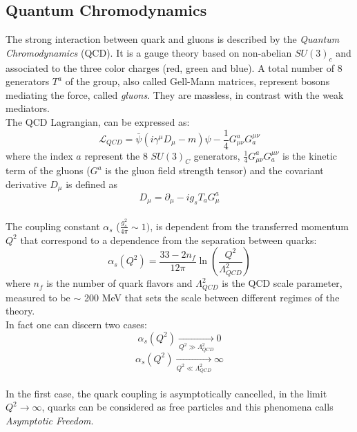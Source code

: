 \subsection{Quantum Chromodynamics} 

The strong interaction between quark and gluons is described by the \textit{Quantum Chromodynamics} (QCD). It is a gauge theory based on non-abelian 
$SU(3)_{c}$\footnotemark {}
and associated to the three color charges (red, green and blue). A total number of 8 generators $T^a$ of the group, also called Gell-Mann matrices,
represent bosons mediating the force, called \textit{gluons}. They are massless, in contrast with the weak mediators.
\vspace{\baselineskip}
\\The QCD Lagrangian, can be expressed as:
\begin{equation}
\mathcal{L}_{QCD}  =  \bar{\psi}(i\gamma^{\mu}D_{\mu}-m)\psi-\frac{1}{4}G^{a}_{\mu\nu}G^{\mu\nu}_a
\end{equation}
where the index $a$ represent the 8 $SU(3)_C$ generators,  $\frac{1}{4}G^{a}_{\mu\nu}G^{\mu\nu}_a$ is the kinetic term of the gluons ($G^a$ is the gluon field strength tensor) and the covariant derivative $D_{\mu}$ is defined as
\begin{equation}
D_{\mu}=\partial_{\mu}-ig_{s}T_{a}G^{a}_{\mu}
\end{equation}
\vspace{\baselineskip}
\\The coupling constant $\alpha_{s}$ ($\frac{g^2_s}{4\pi}\sim 1)$, is dependent from the transferred momentum $Q^2$ that correspond to a dependence from the separation between quarks:
\begin{equation}
\alpha_{s}(Q^2)= \frac{33-2n_f}{12\pi}   \ln\left( \frac{Q^2}{\Lambda^{2}_{QCD}}   \right)
\end{equation}
where $n_f$ is the number of quark flavors and $\Lambda^{2}_{QCD}$ is the QCD scale parameter, measured to be $\sim$ 200 MeV that sets the scale 
between different regimes of the theory. \\
In fact one can discern two cases:
\[\alpha_{s}(Q^2)\xrightarrow[Q^{2} \gg \Lambda^{2}_{QCD} ]{}0\]
\[\alpha_{s}(Q^2)\xrightarrow[Q^{2} \ll \Lambda^{2}_{QCD} ]{}\infty\]
\\In the first case, the quark coupling is asymptotically cancelled, in the limit $Q^{2}\rightarrow \infty$, quarks can be considered as free particles and this phenomena calls \textit{Asymptotic Freedom}.
